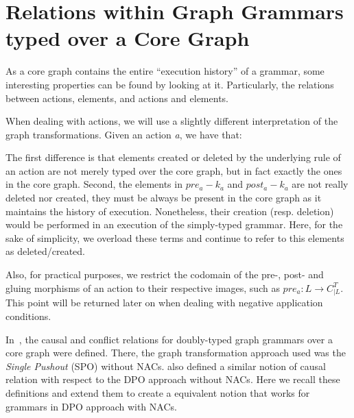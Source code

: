 \section{Relations within Graph Grammars typed over a Core Graph}


As a core graph contains the entire ``execution history'' of a grammar, some interesting properties can be found by looking at it. Particularly, the relations between actions, elements, and actions and elements.

\begin{remark} When dealing with actions, we will use a slightly different interpretation of the graph transformations. Given an action \emph{a}, we have that:
  
\hfill %

The first difference is that elements created or deleted by the underlying rule of an action are not merely typed over the core graph, but in fact exactly the ones in the core graph. Second, the elements in $pre_a - k_a$ and $post_a - k_a$ are not really deleted nor created, they must be always be present in the core graph as it maintains the history of execution. Nonetheless, their creation (resp. deletion) would be performed in an execution of the simply-typed grammar. Here, for the sake of
  simplicity, we overload these terms and continue to refer to this elements as deleted/created.

  Also, for practical purposes, we restrict the codomain of the pre-, post- and gluing morphisms of an action to their respective images, such as $pre_a : L \rightarrow C^T_{|L}$. This point will be returned later on when dealing with negative application conditions.
\end{remark}

In~\cite{Ribeiro1996}, the causal and conflict relations for doubly-typed graph grammars over a core graph were defined. There, the graph transformation approach used was the \emph{Single Pushout} (SPO) without NACs. \cite{Corradini1996} also defined a similar notion of causal relation with respect to the DPO approach without NACs. Here we recall these definitions and extend them to create a equivalent notion that works for grammars in DPO approach with NACs.

